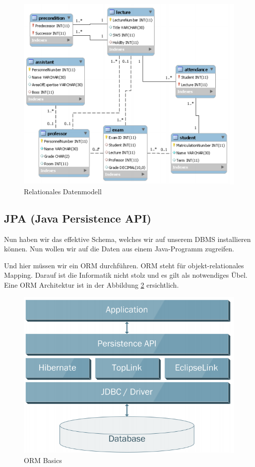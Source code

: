 \begin{figure}[h!]
\centering
\includegraphics[width=0.7\linewidth]{fig/relationales-datenmodell}
\caption{Relationales Datenmodell}
\label{fig:relationales-datenmodell}
\end{figure}

\newpage

\subsection{JPA (Java Persistence API)}
Nun haben wir das effektive Schema, welches wir auf unserem DBMS installieren können. Nun wollen wir auf die Daten aus einem Java-Programm zugreifen.

Und hier müssen wir ein ORM durchführen. ORM steht für objekt-relationales Mapping. Darauf ist die Informatik nicht stolz und es gilt als notwendiges Übel. Eine ORM Architektur ist in der Abbildung \ref{fig:orm-basics} ersichtlich.

\begin{figure}[h!]
\centering
\includegraphics[width=0.5\linewidth]{fig/orm-basics}
\caption{ORM Basics}
\label{fig:orm-basics}
\end{figure}

